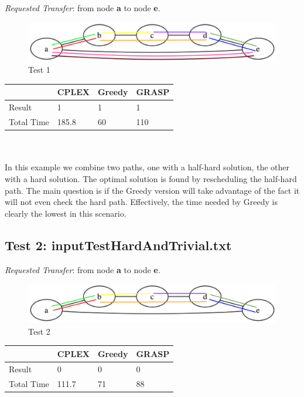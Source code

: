\documentclass[11pt,a4paper]{article}
\begin{document}
\textit{Requested Transfer}: from node \textbf{a} to node \textbf{e}.\\

\begin{figure}[H]
  \centering
    \includegraphics[scale=0.7]{inputTestHardAndHalfHard.png}
  \caption{Test 1}
  \label{fig:test1}
\end{figure}

\begin{tabular}{| l | l | l | l |}
\hline
 & CPLEX & Greedy & GRASP \\ \hline
Result & 1 & 1 & 1 \\ \hline
Total Time & 185.8 & 60 & 110 \\ \hline
\end{tabular}\\\\

In this example we combine two paths, one with a half-hard solution, the other with a hard solution. The optimal solution is found by rescheduling the half-hard path. The main question is if the Greedy version will take advantage of the fact it will not even check the hard path. Effectively, the time needed by Greedy is clearly the lowest in this scenario.

\subsection{Test 2: inputTestHardAndTrivial.txt}

\textit{Requested Transfer}: from node \textbf{a} to node \textbf{e}.\\

\begin{figure}[H]
  \centering
    \includegraphics[scale=0.7]{inputTestHardAndTrivial.png}
  \caption{Test 2}
  \label{fig:test2}
\end{figure}

\begin{tabular}{| l | l | l | l |}
\hline
 & CPLEX & Greedy & GRASP \\ \hline
Result & 0 & 0 & 0 \\ \hline
Total Time & 111.7 & 71 & 88 \\ \hline
\end{tabular}\\\\
\end{document}
